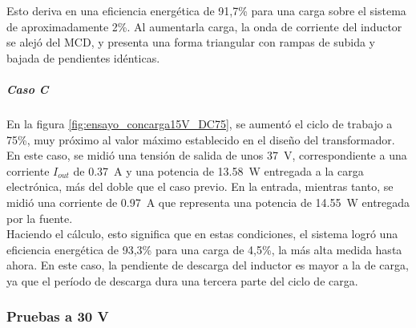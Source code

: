 Esto deriva en una eficiencia energética de 91,7\% para una carga sobre el sistema de aproximadamente 2\%. Al aumentarla carga, la onda de corriente del inductor se alejó del MCD, y presenta una forma triangular con rampas de subida y bajada de pendientes idénticas.\\

\subparagraph{Caso C}

En la figura \ref{fig:ensayo_concarga15V_DC75}, se aumentó el ciclo de trabajo a 75\%, muy próximo al valor máximo establecido en el diseño del transformador. En este caso, se midió una tensión de salida de unos \SI[]{37}{\volt}, correspondiente a una corriente $I_{out}$ de \SI{0.37}{\ampere} y una potencia de \SI[]{13.58}{\watt} entregada a la carga electrónica, más del doble que el caso previo. En la entrada, mientras tanto, se midió una corriente de \SI[]{0.97}{\ampere} que representa una potencia de \SI[]{14.55}{\watt} entregada por la fuente.\\

Haciendo el cálculo, esto significa que en estas condiciones, el sistema logró una eficiencia energética de 93,3\% para una carga de 4,5\%, la más alta medida hasta ahora. En este caso, la pendiente de descarga del inductor es mayor a la de carga, ya que el período de descarga dura una tercera parte del ciclo de carga.\\

\subsubsection{Pruebas a 30 V}

